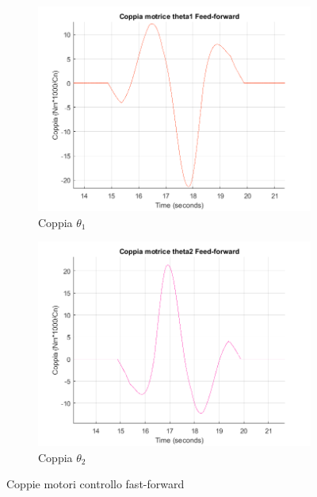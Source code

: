 \begin{figure}
\begin{subfigure}{.5\textwidth}
  \centering
  \includegraphics[width=.8\linewidth]{Immagini/Traiettorie/CoppiaT1FF}  
  \caption{Coppia $\theta_1$}
  \label{fig:sub-ff1}
\end{subfigure}
\begin{subfigure}{.5\textwidth}
  \centering
  \includegraphics[width=.8\linewidth]{Immagini/Traiettorie/CoppiaT2FF}  
  \caption{Coppia $\theta_2$}
  \label{fig:sub-ff2}
\end{subfigure}
\caption{Coppie motori controllo fast-forward}
\label{fig:FFcoppie}
\end{figure}
